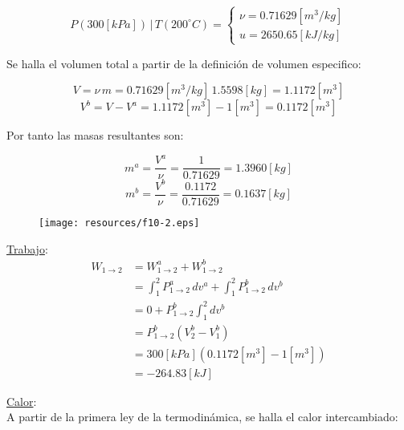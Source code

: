 \documentclass[letter,11pt]{article}
\begin{document}
\begin{enumerate}
\begin{equation*}
    P(300[kPa])\,|\,T(200^\circ C) = \begin{cases}
        \nu = 0.71629[m^3/kg] \\
        u = 2650.65[kJ/kg]
    \end{cases}
\end{equation*}

Se halla el volumen total a partir de la definición de volumen especifico:

\begin{equation*}
    V = \nu\,m = 0.71629[m^3/kg]\,1.5598[kg] = 1.1172[m^3]
\end{equation*}
\begin{equation*}
    V^b = V - V^a = 1.1172[m^3] - 1[m^3] = 0.1172[m^3]
\end{equation*}

Por tanto las masas resultantes son:

\begin{equation*}
    m^a = \frac{V^a}{\nu} = \frac{1}{0.71629} = 1.3960[kg]
\end{equation*}
\begin{equation*}
    m^b = \frac{V^b}{\nu} = \frac{0.1172}{0.71629} = 0.1637[kg]
\end{equation*}

\begin{figure}[H]
\centering
\texttt{[image: resources/f10-2.eps]}
\end{figure}

\underline{Trabajo}: \\
\begin{equation*}
    \begin{split}
    W_{1\rightarrow 2} &= W_{1\rightarrow 2}^a + W_{1\rightarrow 2}^b \\
                       &= \int_1^2 P_{1\rightarrow 2}^a\,dv^a
                          + \int_1^2 P_{1\rightarrow 2}^b\,dv^b \\
                       &= 0 + P_{1\rightarrow 2}^b \int_1^2 dv^b \\
                       &= P_{1\rightarrow 2}^b (V_2^b - V_1^b) \\
                       &= 300[kPa](0.1172[m^3]-1[m^3]) \\
                       &= -264.83[kJ]
    \end{split}
\end{equation*}

\underline{Calor}: \\
A partir de la primera ley de la termodinámica, se halla el calor intercambiado:


\end{enumerate}
\end{document}
